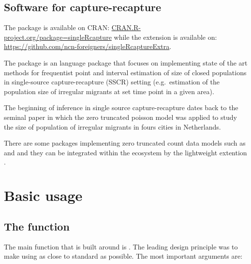 \documentclass[
]{jss}
\newcommand{\1}{\mathcal{I}} \newcommand{\bx}{\boldsymbol{x}}
\begin{document}
\subsection{Software for
capture-recapture}\label{software-for-capture-recapture}

The package is available on CRAN:
\url{CRAN.R-project.org/package=singleRcapture} while the extension is
available on:
\url{https://github.com/ncn-foreigners/singleRcaptureExtra}.

The  package is an  language package
that focuses on implementing state of the art methods for frequentist
point and interval estimation of size of closed populations in
single-source capture-recapture (SSCR) setting (e.g.~estimation of the
population size of irregular migrants at set time point in a given
area).

The beginning of inference in single source capture-recapture dates back
to the seminal \cite{ztpoisson} paper in which the zero truncated
poisson model was applied to study the size of population of irregular
migrants in fours cities in Netherlands.

There are some packages implementing zero truncated count data models
such as  and  and they can be integrated within
the  ecosystem by the lightweight extention
.

\section{Basic usage}\label{basic-usage}

\subsection[The]{The 
function}\label{estimatePopsize-function}

The main function that  is built around is
. The leading design principle was to make using
 as close to standard  as
possible. The most important arguments are:
\end{document}
